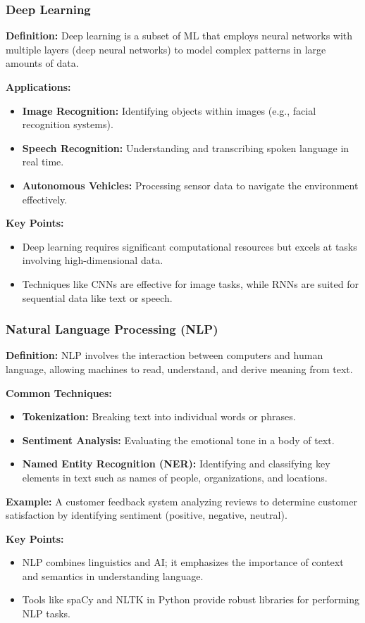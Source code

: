 \documentclass[aspectratio=169]{beamer}
\begin{document}
\begin{frame}[fragile]
    \frametitle{Deep Learning}
    \textbf{Definition:} Deep learning is a subset of ML that employs neural networks with multiple layers (deep neural networks) to model complex patterns in large amounts of data.

    \textbf{Applications:}
    \begin{itemize}
        \item \textbf{Image Recognition:} Identifying objects within images (e.g., facial recognition systems).
        \item \textbf{Speech Recognition:} Understanding and transcribing spoken language in real time.
        \item \textbf{Autonomous Vehicles:} Processing sensor data to navigate the environment effectively.
    \end{itemize}
    
    \textbf{Key Points:}
    \begin{itemize}
        \item Deep learning requires significant computational resources but excels at tasks involving high-dimensional data.
        \item Techniques like CNNs are effective for image tasks, while RNNs are suited for sequential data like text or speech.
    \end{itemize}
\end{frame}

\begin{frame}[fragile]
    \frametitle{Natural Language Processing (NLP)}
    \textbf{Definition:} NLP involves the interaction between computers and human language, allowing machines to read, understand, and derive meaning from text.

    \textbf{Common Techniques:}
    \begin{itemize}
        \item \textbf{Tokenization:} Breaking text into individual words or phrases.
        \item \textbf{Sentiment Analysis:} Evaluating the emotional tone in a body of text.
        \item \textbf{Named Entity Recognition (NER):} Identifying and classifying key elements in text such as names of people, organizations, and locations.
    \end{itemize}
    
    \textbf{Example:} A customer feedback system analyzing reviews to determine customer satisfaction by identifying sentiment (positive, negative, neutral).

    \textbf{Key Points:}
    \begin{itemize}
        \item NLP combines linguistics and AI; it emphasizes the importance of context and semantics in understanding language.
        \item Tools like spaCy and NLTK in Python provide robust libraries for performing NLP tasks.
    \end{itemize}
\end{frame}
\end{document}
